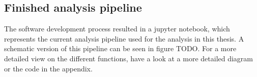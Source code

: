 \subsection{Finished analysis pipeline}
The software development process resulted in a jupyter notebook, which represents the current analysis pipeline used for the analysis in this thesis. A schematic version of this pipeline can be seen in figure TODO. For a more detailed view on the different functions, have a look at a more detailed diagram or the code in the appendix. 
